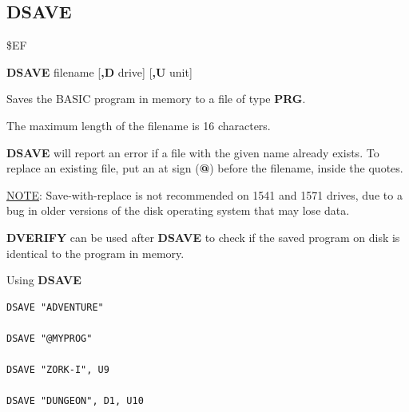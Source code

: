\subsection{DSAVE}
\begin{description}[leftmargin=2cm,style=nextline]
\item [Token:]    \$EF

\item [Format:]   {\bf DSAVE} filename [{\bf,D} drive] [{\bf,U} unit]

\item [Usage:]    Saves the BASIC program in memory to a file of type {\bf PRG}.

                  \filenamedefinition

                  The maximum length of the filename is 16 characters.

                  {\bf DSAVE} will report an error if a file with the given name already exists. To replace an existing file, put an at sign ({\bf @}) before the filename, inside the quotes.

                  \underline{NOTE}: Save-with-replace is not recommended on 1541 and 1571 drives, due to a bug in older versions of the disk operating system that may lose data.

                  \drivedefinition

                  \unitdefinition

\item [Remarks:]  {\bf DVERIFY} can be used after {\bf DSAVE} to check if the saved program on disk is identical to the program
   in memory.

\item [Examples:] Using {\bf DSAVE}

\begin{tcolorbox}[colback=black,coltext=white]
\verbatimfont{\codefont}
\begin{verbatim}
DSAVE "ADVENTURE"

DSAVE "@MYPROG"

DSAVE "ZORK-I", U9

DSAVE "DUNGEON", D1, U10
\end{verbatim}
\end{tcolorbox}
\end{description}


\newpage
